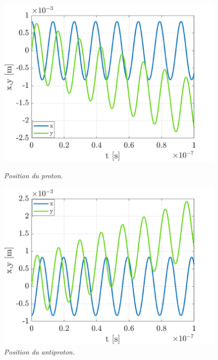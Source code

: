 \documentclass[a4paper,12pt,twoside]{article}
\begin{document}
\begin{figure}
\begin{minipage}[c]{.46\linewidth}
					\centering
					\includegraphics[scale = 0.6]{proton_pos.png}
					\caption{\em\label{Fig: Pos Prot} Position du proton.}
				\end{minipage}
				\hfill%
				\begin{minipage}[c]{.46\linewidth}
					\centering
					\includegraphics[scale = 0.6]{antiproton_pos.png}
					\caption{\em\label{Fig: Pos Anti} Position du antiproton.}
				\end{minipage}
			\end{figure}
		
\end{document}
